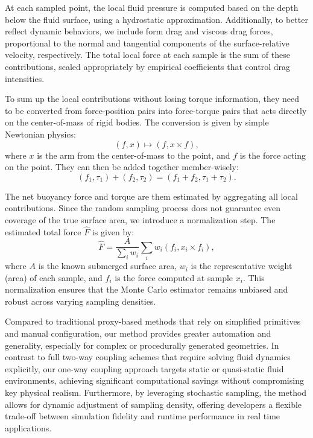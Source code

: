 At each sampled point, the local fluid pressure is computed based on the depth below the fluid surface, using a hydrostatic approximation. Additionally, to better reflect dynamic behaviors, we include form drag and viscous drag forces, proportional to the normal and tangential components of the surface-relative velocity, respectively. The total local force at each sample is the sum of these contributions, scaled appropriately by empirical coefficients that control drag intensities.

To sum up the local contributions without losing torque information, they need to be converted from force-position pairs into force-torque pairs that acts directly on the center-of-mass of rigid bodies. The conversion is given by simple Newtonian physics:
\begin{equation}
	(f, x) \mapsto (f, x\times f),
\end{equation}
where $x$ is the arm from the center-of-mass to the point, and $f$ is the force acting on the point. They can then be added together member-wisely:
\begin{equation}
	(f_1,\tau_1)+(f_2,\tau_2)=(f_1+f_2,\tau_1+\tau_2).
\end{equation}

The net buoyancy force and torque are them estimated by aggregating all local contributions. Since the random sampling process does not guarantee even coverage of the true surface area, we introduce a normalization step. The estimated total force \(\hat{F}\) is given by:
\begin{equation}
	\hat{F}=\frac{A}{\sum_i w_i} \sum_{i}w_i(f_i, x_i\times f_i),
\end{equation}
where \(A\) is the known submerged surface area, \(w_i\) is the representative weight (area) of each sample, and \(f_i\) is the force computed at sample \(x_i\). This normalization ensures that the Monte Carlo estimator remains unbiased and robust across varying sampling densities.

Compared to traditional proxy-based methods that rely on simplified primitives and manual configuration, our method provides greater automation and generality, especially for complex or procedurally generated geometries. In contrast to full two-way coupling schemes that require solving fluid dynamics explicitly, our one-way coupling approach targets static or quasi-static fluid environments, achieving significant computational savings without compromising key physical realism. Furthermore, by leveraging stochastic sampling, the method allows for dynamic adjustment of sampling density, offering developers a flexible trade-off between simulation fidelity and runtime performance in real time applications.